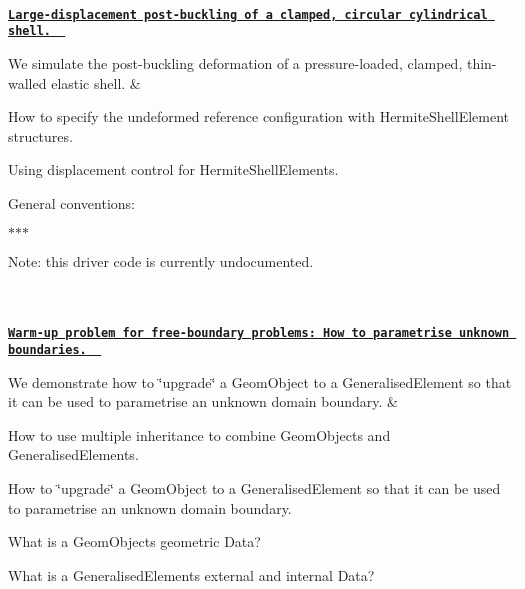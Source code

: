 \begin{longtabu}
{}\\
\href{../../shell/clamped_shell/html/index.html}{\tt {\bfseries Large-\/displacement post-\/buckling of a clamped, circular cylindrical shell. } }

We simulate the post-\/buckling deformation of a pressure-\/loaded, clamped, thin-\/walled elastic shell.  &
\begin{DoxyItemize}
\item How to specify the undeformed reference configuration with {\ttfamily Hermite\+Shell\+Element} structures.
\item Using displacement control for {\ttfamily Hermite\+Shell\+Elements}.
\item General conventions\+:
\begin{DoxyItemize}
\item $\ast$$\ast$$\ast$
\end{DoxyItemize}
\item Note\+: this driver code is currently undocumented.   
\end{DoxyItemize}\\
\\
\href{../../interaction/circle_as_element/html/index.html}{\tt {\bfseries  Warm-\/up problem for free-\/boundary problems\+: How to parametrise unknown boundaries. } }

We demonstrate how to \char`\"{}upgrade\char`\"{} a {\ttfamily Geom\+Object} to a {\ttfamily Generalised\+Element} so that it can be used to parametrise an unknown domain boundary.  &
\begin{DoxyItemize}
\item How to use multiple inheritance to combine {\ttfamily Geom\+Objects} and {\ttfamily Generalised\+Elements}.
\item How to \char`\"{}upgrade\char`\"{} a {\ttfamily Geom\+Object} to a {\ttfamily Generalised\+Element} so that it can be used to parametrise an unknown domain boundary.
\item What is a {\ttfamily Geom\+Object\textquotesingle{}s} geometric {\ttfamily Data}?
\item What is a {\ttfamily Generalised\+Element\textquotesingle{}s} external and internal {\ttfamily Data}? 
\end{DoxyItemize}


\end{longtabu}
